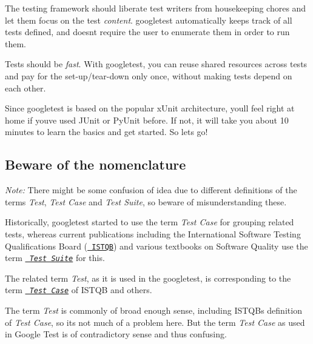 \begin{DoxyEnumerate}
\item The testing framework should liberate test writers from housekeeping chores and let them focus on the test {\itshape content}. googletest automatically keeps track of all tests defined, and doesn\textquotesingle{}t require the user to enumerate them in order to run them.
\end{DoxyEnumerate}
\begin{DoxyEnumerate}
\item Tests should be {\itshape fast}. With googletest, you can reuse shared resources across tests and pay for the set-\/up/tear-\/down only once, without making tests depend on each other.
\end{DoxyEnumerate}

Since googletest is based on the popular x\+Unit architecture, you\textquotesingle{}ll feel right at home if you\textquotesingle{}ve used J\+Unit or Py\+Unit before. If not, it will take you about 10 minutes to learn the basics and get started. So let\textquotesingle{}s go!

\subsection*{Beware of the nomenclature}

{\itshape Note\+:} There might be some confusion of idea due to different definitions of the terms {\itshape Test}, {\itshape Test Case} and {\itshape Test Suite}, so beware of misunderstanding these.

Historically, googletest started to use the term {\itshape Test Case} for grouping related tests, whereas current publications including the International Software Testing Qualifications Board (\href{http://www.istqb.org/}{\texttt{ I\+S\+T\+QB}}) and various textbooks on Software Quality use the term {\itshape \href{http://glossary.istqb.org/search/test%20suite}{\texttt{ Test Suite}}} for this.

The related term {\itshape Test}, as it is used in the googletest, is corresponding to the term {\itshape \href{http://glossary.istqb.org/search/test%20case}{\texttt{ Test Case}}} of I\+S\+T\+QB and others.

The term {\itshape Test} is commonly of broad enough sense, including I\+S\+T\+QB\textquotesingle{}s definition of {\itshape Test Case}, so it\textquotesingle{}s not much of a problem here. But the term {\itshape Test Case} as used in Google Test is of contradictory sense and thus confusing.

